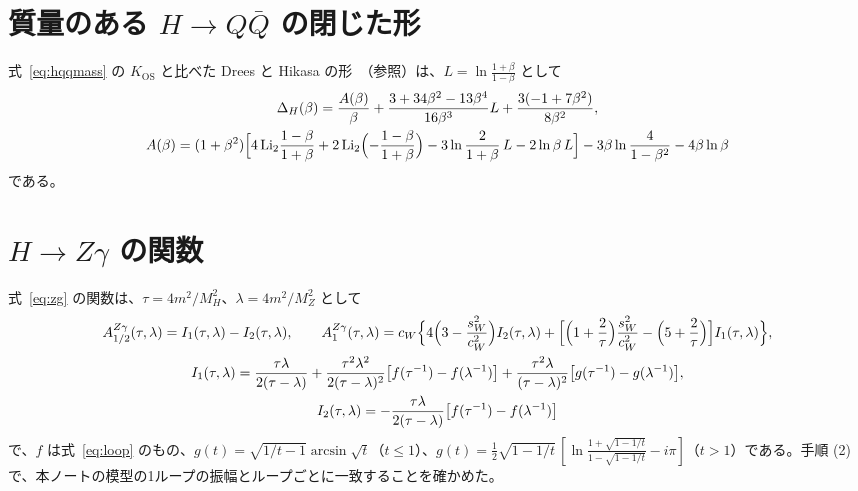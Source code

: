 \documentclass[a4paper,10pt]{ltjsarticle}
\begin{document}
\section{質量のある $H\to Q\bar Q$ の閉じた形}\label{app:dh}

式~\eqref{eq:hqqmass} の $K_{\mathrm{OS}}$ と比べた Drees と Hikasa の形~\cite{dh90}（参照）は、$L=\ln\frac{1+\beta}{1-\beta}$ として
\begin{equation}
\begin{gathered}
\Delta_H(\beta)=\frac{A(\beta)}\beta+\frac{3+34\beta^2-13\beta^4}{16\beta^3}L+\frac{3(-1+7\beta^2)}{8\beta^2},\\
A(\beta)=(1+\beta^2)\Bigl[4\,\mathrm{Li}_2\frac{1-\beta}{1+\beta}+2\,\mathrm{Li}_2\Bigl(-\frac{1-\beta}{1+\beta}\Bigr)-3\ln\frac2{1+\beta}\,L-2\ln\beta\,L\Bigr]-3\beta\ln\frac4{1-\beta^2}-4\beta\ln\beta
\end{gathered}
\label{eq:dh}
\end{equation}
である。

\section{$H\to Z\gamma$ の関数}\label{app:zg}

式~\eqref{eq:zg} の関数は、$\tau=4m^2/M_H^2$、$\lambda=4m^2/M_Z^2$ として~\cite{djouadi08}
\begin{equation}
\begin{gathered}
A^{Z\gamma}_{1/2}(\tau,\lambda)=I_1(\tau,\lambda)-I_2(\tau,\lambda),\qquad
A^{Z\gamma}_1(\tau,\lambda)=c_W\Bigl\{4\Bigl(3-\frac{s_W^2}{c_W^2}\Bigr)I_2(\tau,\lambda)+\Bigl[\Bigl(1+\frac2\tau\Bigr)\frac{s_W^2}{c_W^2}-\Bigl(5+\frac2\tau\Bigr)\Bigr]I_1(\tau,\lambda)\Bigr\},\\
I_1(\tau,\lambda)=\frac{\tau\lambda}{2(\tau-\lambda)}+\frac{\tau^2\lambda^2}{2(\tau-\lambda)^2}\bigl[f(\tau^{-1})-f(\lambda^{-1})\bigr]+\frac{\tau^2\lambda}{(\tau-\lambda)^2}\bigl[g(\tau^{-1})-g(\lambda^{-1})\bigr],\\
I_2(\tau,\lambda)=-\frac{\tau\lambda}{2(\tau-\lambda)}\bigl[f(\tau^{-1})-f(\lambda^{-1})\bigr]
\end{gathered}
\label{eq:zgfun}
\end{equation}
で、$f$ は式~\eqref{eq:loop} のもの、$g(t)=\sqrt{1/t-1}\arcsin\sqrt t$（$t\le1$）、$g(t)=\frac12\sqrt{1-1/t}\,[\ln\frac{1+\sqrt{1-1/t}}{1-\sqrt{1-1/t}}-i\pi]$（$t>1$）である。手順 (2) で、本ノートの模型の1ループの振幅とループごとに一致することを確かめた。
\end{document}
